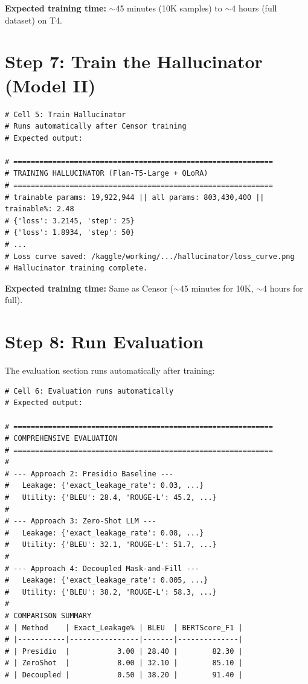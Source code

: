 \documentclass[11pt, a4paper]{article}
\begin{document}
\textbf{Expected training time:} $\sim$45 minutes (10K samples) to $\sim$4 hours (full dataset) on T4.

\section{Step 7: Train the Hallucinator (Model II)}

\begin{lstlisting}[style=python]
# Cell 5: Train Hallucinator
# Runs automatically after Censor training
# Expected output:

# ============================================================
# TRAINING HALLUCINATOR (Flan-T5-Large + QLoRA)
# ============================================================
# trainable params: 19,922,944 || all params: 803,430,400 || trainable%: 2.48
# {'loss': 3.2145, 'step': 25}
# {'loss': 1.8934, 'step': 50}
# ...
# Loss curve saved: /kaggle/working/.../hallucinator/loss_curve.png
# Hallucinator training complete.
\end{lstlisting}

\textbf{Expected training time:} Same as Censor ($\sim$45 minutes for 10K, $\sim$4 hours for full).

\section{Step 8: Run Evaluation}

The evaluation section runs automatically after training:

\begin{lstlisting}[style=python]
# Cell 6: Evaluation runs automatically
# Expected output:

# ============================================================
# COMPREHENSIVE EVALUATION
# ============================================================
#
# --- Approach 2: Presidio Baseline ---
#   Leakage: {'exact_leakage_rate': 0.03, ...}
#   Utility: {'BLEU': 28.4, 'ROUGE-L': 45.2, ...}
#
# --- Approach 3: Zero-Shot LLM ---
#   Leakage: {'exact_leakage_rate': 0.08, ...}
#   Utility: {'BLEU': 32.1, 'ROUGE-L': 51.7, ...}
#
# --- Approach 4: Decoupled Mask-and-Fill ---
#   Leakage: {'exact_leakage_rate': 0.005, ...}
#   Utility: {'BLEU': 38.2, 'ROUGE-L': 58.3, ...}
#
# COMPARISON SUMMARY
# | Method    | Exact_Leakage% | BLEU  | BERTScore_F1 |
# |-----------|----------------|-------|--------------|
# | Presidio  |           3.00 | 28.40 |        82.30 |
# | ZeroShot  |           8.00 | 32.10 |        85.10 |
# | Decoupled |           0.50 | 38.20 |        91.40 |
\end{lstlisting}
\end{document}
